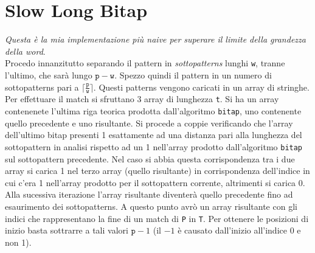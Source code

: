 \documentclass[a4paper,12pt, oneside]{article}
\begin{document}
\section*{Slow Long Bitap}
\textit{Questa è la mia implementazione più naive per superare il limite della
  grandezza della word}.\\
Procedo innanzitutto separando il pattern in \textit{sottopatterns}
lunghi \texttt{w}, tranne l'ultimo, che sarà lungo $\mathtt{p} -
\mathtt{w}$. Spezzo quindi il pattern in un numero di sottopatterns
pari a $\lceil \frac{\mathtt{p}}{\mathtt{w}}\rceil$. Questi patterns
vengono caricati in un array di stringhe.\\
Per effettuare il match si sfruttano 3 array di lunghezza
\texttt{t}. Si ha un array contenenete l'ultima riga teorica prodotta
dall'algoritmo \texttt{bitap}, uno contenente quello precedente e uno
risultante. Si procede a coppie verificando che l'array dell'ultimo
bitap presenti 1 esattamente ad una distanza pari alla lunghezza del
sottopattern in analisi rispetto ad un 1 nell'array prodotto
dall'algoritmo \texttt{bitap} sul sottopattern precedente. Nel caso si
abbia questa corrispondenza tra i due array si carica 1 nel terzo array (quello
risultante) in corrispondenza dell'indice in cui c'era 1 nell'array
prodotto per il sottopattern corrente, altrimenti si carica 0. Alla
sucessiva iterazione l'array risultante diventerà quello precedente
fino ad esaurimento dei sottopatterns. A questo punto avrò un array
risultante con gli indici che rappresentano la fine di un match di
\texttt{P} in \texttt{T}. Per ottenere le posizioni di inizio basta
sottrarre a tali valori $\mathtt{p} - 1$ (il $-1$ è causato
dall'inizio all'indice 0 e non 1).
\newpage
\end{document}
